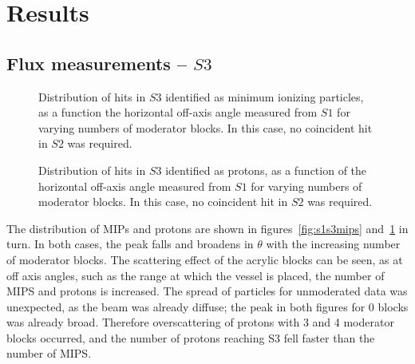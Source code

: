 \section{Results}
\label{hptpcPaper:sec:Results}

	\subsection{Flux measurements -- $S3$}

	
	\begin{figure}[h]
		\begin{minipage}{0.48\textwidth}
			\begin{adjustbox}{max totalsize={\textwidth}{.35\textheight},center}
				
			\end{adjustbox}
			\caption{Distribution of hits in $S3$ identified as minimum ionizing particles, as a function the horizontal off-axis angle measured from $S1$ for varying numbers of moderator blocks. In this case, no coincident hit in $S2$ was required.}
			\label{fig:s1s3mips}
		\end{minipage}
		\hspace{0.3cm}
		\begin{minipage}{0.48\textwidth}
			\begin{adjustbox}{max totalsize={\textwidth}{.35\textheight},center}
				
			\end{adjustbox}
			\caption{Distribution of hits in $S3$ identified as protons, as a function of the horizontal off-axis angle measured from $S1$ for varying numbers of moderator blocks. In this case, no coincident hit in $S2$ was required.}
			\label{fig:s1s3protons}
		\end{minipage}
	\end{figure}

    The distribution of MIPs and protons are shown in figures~\ref{fig:s1s3mips} and~\ref{fig:s1s3protons} in turn. 
    In both cases, the peak falls and broadens in $\theta$ with the increasing number of moderator blocks. 
    The scattering effect of the acrylic blocks can be seen, as at off axis angles, such as the range at which the vessel is placed, the number of MIPS and protons is increased.
    The spread of particles for unmoderated data was unexpected, as the beam was already diffuse; the peak in both figures for 0 blocks was already broad.
    Therefore overscattering of protons with 3 and 4 moderator blocks occurred, and the number of protons reaching S3 fell faster than the number of MIPS.

